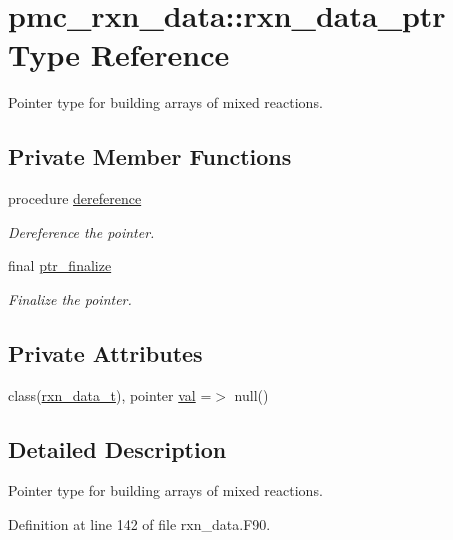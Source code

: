 \hypertarget{structpmc__rxn__data_1_1rxn__data__ptr}{}\section{pmc\+\_\+rxn\+\_\+data\+:\+:rxn\+\_\+data\+\_\+ptr Type Reference}
\label{structpmc__rxn__data_1_1rxn__data__ptr}


Pointer type for building arrays of mixed reactions.  


\subsection*{Private Member Functions}
\begin{DoxyCompactItemize}
\item 
procedure \mbox{\hyperlink{structpmc__rxn__data_1_1rxn__data__ptr_a81b7d05c3748d9fd62f654e5ce8ecf94}{dereference}}
\begin{DoxyCompactList}\small\item\em Dereference the pointer. \end{DoxyCompactList}\item 
final \mbox{\hyperlink{structpmc__rxn__data_1_1rxn__data__ptr_a6a5ab5928805fa8862a213a7a276ea2a}{ptr\+\_\+finalize}}
\begin{DoxyCompactList}\small\item\em Finalize the pointer. \end{DoxyCompactList}\end{DoxyCompactItemize}
\subsection*{Private Attributes}
\begin{DoxyCompactItemize}
\item 
class(\mbox{\hyperlink{structpmc__rxn__data_1_1rxn__data__t}{rxn\+\_\+data\+\_\+t}}), pointer \mbox{\hyperlink{structpmc__rxn__data_1_1rxn__data__ptr_a1b9244e8a9daf85e650052ef16ccac50}{val}} =$>$ null()
\end{DoxyCompactItemize}


\subsection{Detailed Description}
Pointer type for building arrays of mixed reactions. 

Definition at line 142 of file rxn\+\_\+data.\+F90.



